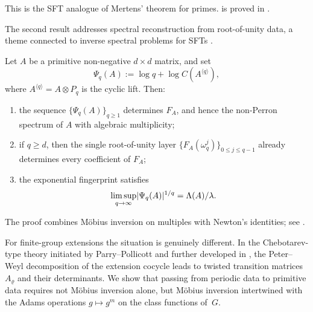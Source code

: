 This is the SFT analogue of Mertens' theorem for primes.
 is proved in
.

The second result addresses spectral reconstruction from
root-of-unity data, a theme connected to inverse spectral problems for
SFTs \cite{LindMarcus1995}.

\begin{theorem}
  \label{thm:intro-cyclic-reconstruction}
  Let \(A\) be a primitive non-negative \(d\times d\) matrix, and set
  \[
    \Psi_q(A):=\log q+\log C(A^{\langle q\rangle}),
  \]
  where \(A^{\langle q\rangle}=A\otimes P_q\) is the cyclic lift.
  Then:
  \begin{enumerate}[label=\textup{(\roman*)}]
    \item the sequence \(\{\Psi_q(A)\}_{q\ge 1}\) determines \(F_A\),
      and hence the non-Perron spectrum of \(A\) with algebraic
      multiplicity;
    \item if \(q\ge d\), then the single root-of-unity layer
      \(\{F_A(\omega_q^j)\}_{0\le j\le q-1}\) already determines every
      coefficient of \(F_A\);
    \item the exponential fingerprint satisfies
      \[
        \limsup_{q\to\infty}\lvert \Psi_q(A) \rvert^{1/q}
        =
        \Lambda(A)/\lambda.
      \]
  \end{enumerate}
\end{theorem}

The proof combines M\"obius inversion on multiples with Newton's
identities; see
.

For finite-group extensions the situation is genuinely different. In
the Chebotarev-type theory initiated by Parry--Pollicott
\cite{ParryPollicott1986Chebotarev} and further developed in
\cite{NooraniParry1992ChebotarevShifts,%
PollicottSharp2007Chebotarev,%
BoyleSchmieding2017FiniteGroupExtensions,%
Parry1999LivsicNonAbelian},
the Peter--Weyl decomposition of
the extension cocycle leads to twisted transition matrices
\(A_\varrho\) and their determinants. We show that passing from
periodic data to primitive data requires not M\"obius inversion alone,
but M\"obius inversion intertwined with the Adams operations
\(g\mapsto g^m\) on the class functions of~\(G\).

